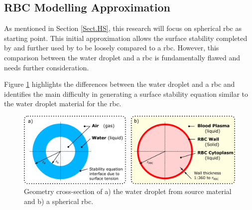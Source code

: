 \subsection{RBC Modelling Approximation}
\noindent As mentioned in Section \ref{Sect.HS}, this research will focus on spherical \ac{rbc} as starting point. This initial approximation allows the surface stability completed by \citet{Prosperetti1974} and further used by \citet{Zeng2018} to be loosely compared to a \ac{rbc}. However, this comparison between the water droplet and a \ac{rbc} is fundamentally flawed and needs further consideration. 

Figure \ref{fig.rbc.actual} highlights the differences between the water droplet and a \ac{rbc} and identifies the main difficulty in generating a surface stability equation similar to the water droplet material \cite{Prosperetti1974,Zeng2018} for the \ac{rbc}.
\\
\begin{figure}[H]
	\centering
	
	\includegraphics[width=1\linewidth]{fig/Actual}
	
	\caption{Geometry cross-section of a) the water droplet from source material and b) a spherical \ac{rbc}.  }
	\label{fig.rbc.actual}
\end{figure}

